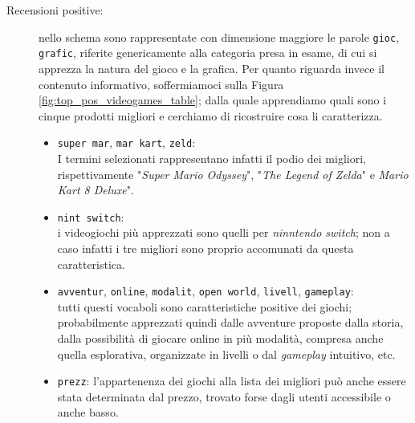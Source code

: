 			\begin{description}
				\item[Recensioni positive:]
				nello schema sono rappresentate con dimensione maggiore le parole \verb|gioc|, \verb|grafic|, riferite genericamente alla categoria presa in esame, di cui si apprezza la natura del gioco e la grafica. Per quanto riguarda invece il contenuto informativo, soffermiamoci sulla Figura \ref{fig:top_pos_videogames_table}; dalla quale apprendiamo quali sono i cinque prodotti migliori e cerchiamo di ricostruire cosa li caratterizza.
				\begin{itemize}
					\item \texttt{super mar}, \texttt{mar kart}, \texttt{zeld}: \\
					I termini selezionati rappresentano infatti il podio dei migliori, rispettivamente "\textit{Super Mario Odyssey}", "\textit{The Legend of Zelda}" e \textit{Mario Kart 8 Deluxe}". 
					\item \texttt{nint switch}: \\
					i videogiochi più apprezzati sono quelli per \textit{ninntendo switch}; non a caso infatti i tre migliori sono proprio accomunati da questa caratteristica.
					\item \texttt{avventur}, \texttt{online}, \texttt{modalit}, \texttt{open world}, \texttt{livell}, \texttt{gameplay}: \\
					tutti questi vocaboli sono caratteristiche positive dei giochi; probabilmente apprezzati quindi dalle avventure proposte dalla storia, dalla possibilità di giocare online in più modalità, compresa anche quella esplorativa, organizzate in livelli o dal \textit{gameplay} intuitivo, etc.
					\item \texttt{prezz}: l'appartenenza dei giochi alla lista dei migliori può anche essere stata determinata dal prezzo, trovato forse dagli utenti accessibile o anche basso.
				\end{itemize}	
								

\end{description}
